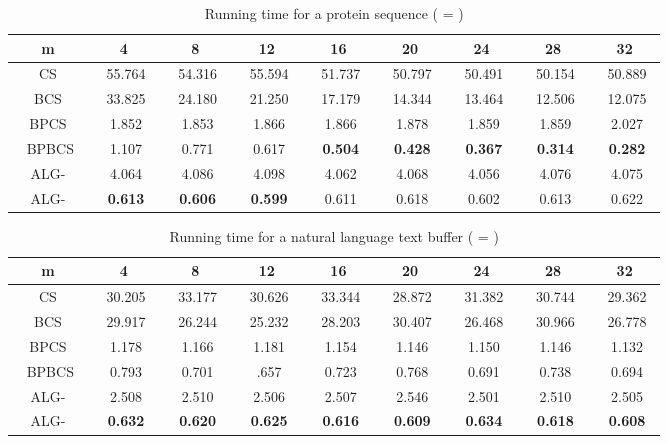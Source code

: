 \documentclass{llncs}
\newcommand{\rom}[1]{\uppercase\expandafter{\romannumeral #1\relax}}
\begin{document}
{\begin{table}
\begin{center}
\begin{tabular}{|c|c|c|c|c|c|c|c|c|}
\hline
m&4&8&12&16&20&24&28&32\\
\hline
CS &~ 55.764~ &~ 54.316~ &~ 55.594~ &~ 51.737~ &~ 50.797~ &~ 50.491~ &~ 50.154~ &~ 50.889~ \\
\hline
BCS &~ 33.825~ &~ 24.180~ &~ 21.250~ &~ 17.179~ &~ 14.344~ &~ 13.464~ &~ 12.506~ &~ 12.075~ \\
\hline
BPCS &~ 1.852~ &~ 1.853~ &~ 1.866~ &~ 1.866~ &~ 1.878~ &~ 1.859~ &~ 1.859~ &~ 2.027~ \\
\hline
~ BPBCS~ &~ 1.107~ &~ 0.771~ &~ 0.617~ &~ \textbf{0.504}~ &~ \textbf{0.428}~ &~ \textbf{0.367}~ &~ \textbf{0.314}~ &~ \textbf{0.282}~ \\
\hline
ALG-\rom{2} &~ 4.064~ &~ 4.086~ &~ 4.098~ &~ 4.062~ &~ 4.068~ &~ 4.056~ &~ 4.076~ &~ 4.075~ \\
\hline
ALG-\rom{1} &~ \textbf{0.613}~ &~ \textbf{0.606}~ &~ \textbf{0.599}~ &~ 0.611~ &~ 0.618~ &~ 0.602~ &~ 0.613~ &~ 0.622~ \\
\hline
\end{tabular}
\caption{Running time for a protein sequence ( = )} \label{protein}
\end{center}
\end{table}


\begin{table}
\begin{center}
\begin{tabular}{|c|c|c|c|c|c|c|c|c|}
\hline
m&4&8&12&16&20&24&28&32\\
\hline
CS &~ 30.205~ &~ 33.177~ &~ 30.626~ &~ 33.344~ &~ 28.872~ &~ 31.382~ &~ 30.744~ &~ 29.362~ \\
\hline
BCS &~ 29.917~ &~ 26.244~ &~ 25.232~ &~ 28.203~ &~ 30.407~ &~ 26.468~ &~ 30.966~ &~ 26.778~ \\
\hline
BPCS &~ 1.178~ &~ 1.166~ &~ 1.181~ &~ 1.154~ &~ 1.146~ &~ 1.150~ &~ 1.146~ &~ 1.132~ \\
\hline
~ BPBCS~ &~ 0.793~ &~ 0.701~ &~ .657~ &~ 0.723~ &~ 0.768~ &~ 0.691~ &~ 0.738~ &~ 0.694~ \\
\hline
ALG-\rom{2} &~ 2.508~ &~ 2.510~ &~ 2.506~ &~ 2.507~ &~ 2.546~ &~ 2.501~ &~ 2.510~ &~ 2.505~ \\
\hline
ALG-\rom{1} &~ \textbf{0.632}~ &~ \textbf{0.620}~ &~ \textbf{0.625}~ &~ \textbf{0.616}~ &~ \textbf{0.609}~ &~ \textbf{0.634}~ &~ \textbf{0.618}~ &~ \textbf{0.608}~ \\
\hline
\end{tabular}
\caption{Running time for a natural language text buffer ( = )} \label{natural}
\end{center}
\end{table}




}
\end{document}
